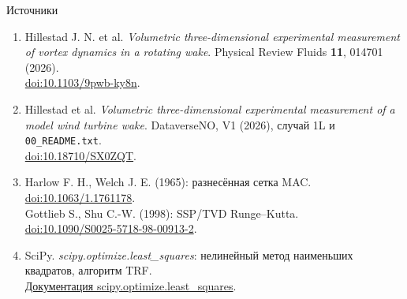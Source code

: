 \documentclass{beamer}
\begin{document}
\begin{frame}{Источники}
\small
\begin{enumerate}
\item Hillestad J. N. et al.
\emph{Volumetric three-dimensional experimental measurement of
vortex dynamics in a rotating wake}.
Physical Review Fluids \textbf{11}, 014701 (2026).\\
\href{https://doi.org/10.1103/9pwb-ky8n}{doi:10.1103/9pwb-ky8n}.
\smallskip
\item Hillestad et al. \emph{Volumetric three-dimensional experimental
measurement of a model wind turbine wake}.
DataverseNO, V1 (2026), случай 1L и \texttt{00\_README.txt}.\\
\href{https://doi.org/10.18710/SX0ZQT}{doi:10.18710/SX0ZQT}.
\smallskip
\item Harlow F. H., Welch J. E. (1965): разнесённая сетка MAC.\\
\href{https://doi.org/10.1063/1.1761178}{doi:10.1063/1.1761178}.\\
Gottlieb S., Shu C.-W. (1998): SSP/TVD Runge--Kutta.\\
\href{https://doi.org/10.1090/S0025-5718-98-00913-2}{doi:10.1090/S0025-5718-98-00913-2}.
\smallskip
\item SciPy. \emph{scipy.optimize.least\_squares}:
нелинейный метод наименьших квадратов, алгоритм TRF.\\
\href{https://docs.scipy.org/doc/scipy/reference/generated/scipy.optimize.least_squares.html}{Документация scipy.optimize.least\_squares}.
\end{enumerate}
\end{frame}
\end{document}
